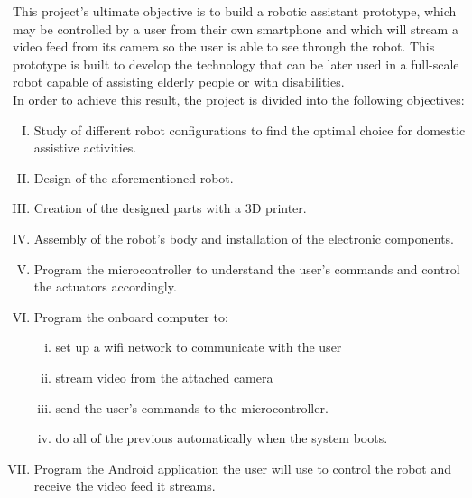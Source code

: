This project's ultimate objective is to build a robotic assistant prototype, which may be controlled by a user from their own smartphone and which will stream a video feed from its camera so the user is able to see through the robot. This prototype is built to develop the technology that can be later used in a full-scale robot capable of assisting elderly people or with disabilities.\\

In order to achieve this result, the project is divided into the following objectives:

	\begin{enumerate}[I.]

		\item Study of different robot configurations to find the optimal choice for domestic assistive activities.\\

		\item Design of the aforementioned robot.\\

		\item Creation of the designed parts with a 3D printer.\\

		\item Assembly of the robot's body and installation of the electronic components.\\

		\item Program the microcontroller to understand the user's commands and control the actuators accordingly.\\

		\item Program the onboard computer to: 
			\begin{enumerate}[i.] 
			\item set up a wifi network to communicate with the user
			\item stream video from the attached camera 
			\item send the user's commands to the microcontroller.
			\item do all of the previous automatically when the system boots.\\
			\end{enumerate}

	
		\item Program the Android application the user will use to control the robot and receive the video feed it streams.

	\end{enumerate}






